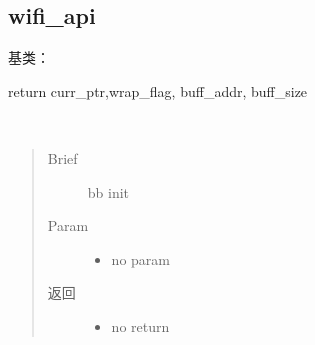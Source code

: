 \documentclass[letterpaper,10pt,english]{sphinxhowto}
\begin{document}
\subsection{wifi\_api}
\label{\detokenize{rfapi/index:module-wifi_api}}\label{\detokenize{rfapi/index:wifi-api}}

\begin{fulllineitems}
\label{\detokenize{rfapi/index:wifi_api.WIFIAPI}}
基类：

\begin{fulllineitems}
\label{\detokenize{rfapi/index:wifi_api.WIFIAPI.adctrig}}
return curr\_ptr,wrap\_flag, buff\_addr, buff\_size

\end{fulllineitems}


\begin{fulllineitems}
\label{\detokenize{rfapi/index:wifi_api.WIFIAPI.bbinit}}~\begin{quote}\begin{description}
\item[{Brief}] \leavevmode
bb init

\item[{Param}] \leavevmode\begin{itemize}
\item {} 
no param

\end{itemize}

\item[{返回}] \leavevmode
\begin{itemize}
\item {} 
no return

\end{itemize}


\end{description}\end{quote}


\end{fulllineitems}
\end{fulllineitems}
\end{document}
